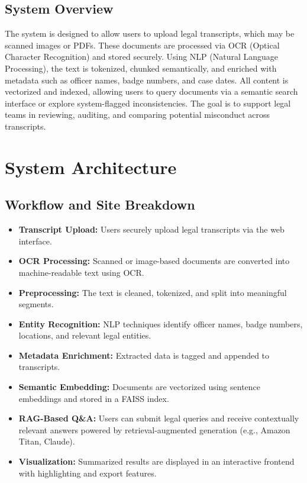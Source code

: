 \documentclass[11pt]{article}
\begin{document}
\subsection{System Overview}
The system is designed to allow users to upload legal transcripts, which may be scanned images or PDFs. These documents are processed via OCR (Optical Character Recognition) and stored securely. Using NLP (Natural Language Processing), the text is tokenized, chunked semantically, and enriched with metadata such as officer names, badge numbers, and case dates. All content is vectorized and indexed, allowing users to query documents via a semantic search interface or explore system-flagged inconsistencies. The goal is to support legal teams in reviewing, auditing, and comparing potential misconduct across transcripts.

\newpage
\section{System Architecture}
\subsection{Workflow and Site Breakdown}
\begin{itemize}
\item \textbf{Transcript Upload:} Users securely upload legal transcripts via the web interface.
\item \textbf{OCR Processing:} Scanned or image-based documents are converted into machine-readable text using OCR.
\item \textbf{Preprocessing:} The text is cleaned, tokenized, and split into meaningful segments.
\item \textbf{Entity Recognition:} NLP techniques identify officer names, badge numbers, locations, and relevant legal entities.
\item \textbf{Metadata Enrichment:} Extracted data is tagged and appended to transcripts.
\item \textbf{Semantic Embedding:} Documents are vectorized using sentence embeddings and stored in a FAISS index.
\item \textbf{RAG-Based Q\&A:} Users can submit legal queries and receive contextually relevant answers powered by retrieval-augmented generation (e.g., Amazon Titan, Claude).
\item \textbf{Visualization:} Summarized results are displayed in an interactive frontend with highlighting and export features.
\end{itemize}
\end{document}

